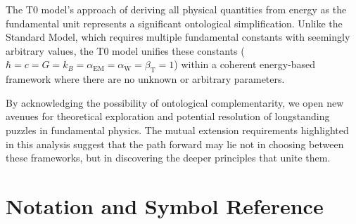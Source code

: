 \documentclass[12pt,a4paper]{article}
\newcommand{\betaT}{\beta_{\text{T}}}
\newcommand{\alphaEM}{\alpha_{\text{EM}}}
\newcommand{\alphaW}{\alpha_{\text{W}}}
\begin{document}
	The T0 model's approach of deriving all physical quantities from energy as the fundamental unit represents a significant ontological simplification. Unlike the Standard Model, which requires multiple fundamental constants with seemingly arbitrary values, the T0 model unifies these constants ($\hbar = c = G = k_B = \alphaEM = \alphaW = \betaT = 1$) within a coherent energy-based framework where there are no unknown or arbitrary parameters.
	
	By acknowledging the possibility of ontological complementarity, we open new avenues for theoretical exploration and potential resolution of longstanding puzzles in fundamental physics. The mutual extension requirements highlighted in this analysis suggest that the path forward may lie not in choosing between these frameworks, but in discovering the deeper principles that unite them.
	
	\section{Notation and Symbol Reference}
	
\end{document}
